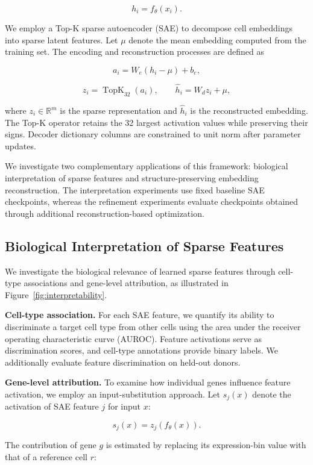 \documentclass{article}
\begin{document}
\[
h_i=f_\theta(x_i).
\]

We employ a Top-K sparse autoencoder (SAE) to decompose cell embeddings into sparse latent features. Let \(\mu\) denote the mean embedding computed from the training set. The encoding and reconstruction processes are defined as

\[
a_i=W_e(h_i-\mu)+b_e,
\]

\[
z_i=\operatorname{TopK}_{32}(a_i),
\qquad
\hat h_i=W_dz_i+\mu,
\]

where \(z_i\in\mathbb{R}^{m}\) is the sparse representation and \(\hat h_i\) is the reconstructed embedding. The Top-K operator retains the 32 largest activation values while preserving their signs. Decoder dictionary columns are constrained to unit norm after parameter updates.

We investigate two complementary applications of this framework: biological interpretation of sparse features and structure-preserving embedding reconstruction. The interpretation experiments use fixed baseline SAE checkpoints, whereas the refinement experiments evaluate checkpoints obtained through additional reconstruction-based optimization.

\subsection{Biological Interpretation of Sparse Features}

We investigate the biological relevance of learned sparse features through cell-type associations and gene-level attribution, as illustrated in Figure~\ref{fig:interpretability}.

\textbf{Cell-type association.} For each SAE feature, we quantify its ability to discriminate a target cell type from other cells using the area under the receiver operating characteristic curve (AUROC). Feature activations serve as discrimination scores, and cell-type annotations provide binary labels. We additionally evaluate feature discrimination on held-out donors.

\textbf{Gene-level attribution.} To examine how individual genes influence feature activation, we employ an input-substitution approach. Let \(s_j(x)\) denote the activation of SAE feature \(j\) for input \(x\):

\[
s_j(x)=z_j(f_\theta(x)).
\]

The contribution of gene \(g\) is estimated by replacing its expression-bin value with that of a reference cell \(r\):
\end{document}
